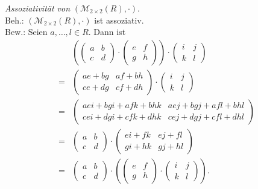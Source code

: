\documentclass[12pt,a4paper]{article}
\begin{document}
\begin{enumerate}[(a)]
    \textit{Assoziativität von} $(\mathcal{M}_{2\times2}(R), \cdot)$.\\
    Beh.: $(\mathcal{M}_{2\times2}(R), \cdot)$ ist assoziativ.\\
    Bew.: Seien $a,\dots,l \in R$.
    Dann ist
    \begin{align*}
        &\left(\begin{pmatrix}
        a&b\\c&d
        \end{pmatrix} \cdot \begin{pmatrix}
        e&f\\g&h
        \end{pmatrix}\right) \cdot \begin{pmatrix}
        i&j\\k&l
        \end{pmatrix}\\
        = &\begin{pmatrix}
        ae + bg & af + bh\\
        ce + dg & cf + dh
        \end{pmatrix} \cdot \begin{pmatrix}
        i&j\\k&l
        \end{pmatrix}\\
        = &\begin{pmatrix}
        aei+bgi+afk+bhk & aej+bgj+afl+bhl\\
        cei+dgi+cfk+dhk & cej+dgj+cfl+dhl
        \end{pmatrix}\\
        = &\begin{pmatrix}
        a&b\\c&d
        \end{pmatrix} \cdot \begin{pmatrix}
        ei+fk & ej+fl\\
        gi+hk & gj+hl
        \end{pmatrix}\\
        = &\begin{pmatrix}
        a&b\\c&d
        \end{pmatrix} \cdot \left(\begin{pmatrix}
        e&f\\g&h
        \end{pmatrix} \cdot \begin{pmatrix}
        i&j\\k&l
        \end{pmatrix}\right).
    \end{align*}


\end{enumerate}
\end{document}
